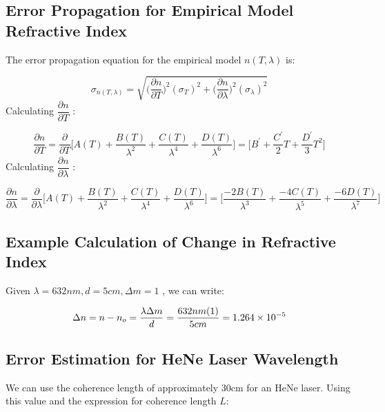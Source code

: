 \documentclass{article}
\begin{document}
\clearpage

\subsection{Error Propagation for Empirical Model Refractive Index}

The error propagation equation for the empirical model $n(T, \lambda)$ is:

\begin{equation}
    \sigma_{n(T,\lambda)} = \sqrt{ \bigg(\dfrac{\partial{n}}{\partial{T}}\bigg)^2(\sigma_T)^2 + \bigg(\dfrac{\partial{n}}{\partial{\lambda}}\bigg)^2(\sigma_\lambda)^2}
\end{equation}
Calculating $\dfrac{\partial{n}}{\partial{T}}$ :

\begin{equation}
	\dfrac{\partial{n}}{\partial{T}} = 
    \dfrac{\partial}{\partial{T}}\bigg[   A(T) + \dfrac{B(T)}{\lambda^2}  + \dfrac{C(T)}{\lambda^4}   + \dfrac{D(T)}{\lambda^6}\bigg] =
    \bigg[ B^{'} + \dfrac{C^{'}}{2}T + \dfrac{D^{'}}{3}T^2 \bigg]
\end{equation}
Calculating  $\dfrac{\partial{n}}{\partial{\lambda}}$  :

\begin{equation}
\dfrac{\partial{n}}{\partial{\lambda}} = 
    \dfrac{\partial}{\partial{\lambda}}\bigg[   A(T) + \dfrac{B(T)}{\lambda^2}  + \dfrac{C(T)}{\lambda^4}   + \dfrac{D(T)}{\lambda^6}\bigg] =
    \bigg[   \dfrac{-2B(T)}{\lambda^3}  + \dfrac{-4C(T)}{\lambda^5}   + \dfrac{-6D(T)}{\lambda^7}\bigg]
\end{equation}
\subsection{Example Calculation of Change in Refractive Index}

Given $\lambda = 632nm, d = 5cm, \Delta{m} = 1$ , we can write:


\begin{equation}
	\Delta{n} =  n - n_o=\frac{\lambda\Delta{m}}{d} = \frac{632nm(1)}{5cm} = \num{1.264d-5}
\end{equation}



\clearpage

\subsection{Error Estimation for HeNe Laser Wavelength}\label{app:wavelength_error_estimate}
We can use the coherence length of approximately 30cm for an HeNe laser. Using this value and the expression for coherence length $L$:
\end{document}
